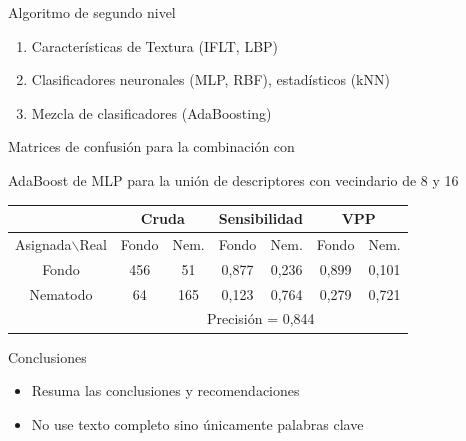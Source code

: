 \documentclass[15pt]{beamer} %
\begin{document}
\begin{frame}{Algoritmo de segundo nivel}
  
  \begin{enumerate}
  \item Características de Textura (IFLT, LBP)
  \item Clasificadores neuronales (MLP, RBF), estadísticos (kNN)
  \item Mezcla de clasificadores (AdaBoosting)
  \end{enumerate}


  \begin{center}
    {\footnotesize Matrices de confusión para la combinación con}

    {\footnotesize AdaBoost de MLP para la unión de descriptores con 
      vecindario de 8 y 16}
    \begin{tabular}{|c|cc|cc|cc|}
      \hline
      & \multicolumn{2}{c|}{Cruda} & \multicolumn{2}{c|}{Sensibilidad} & 
      \multicolumn{2}{c|}{VPP} \\
      \hline
      Asignada$\backslash$Real& Fondo & Nem.& Fondo & Nem.& Fondo & Nem. \\
      \hline
      Fondo & 456 & 51 & 0,877 & 0,236 & 0,899 & 0,101 \\
      Nematodo & 64 & 165 & 0,123 & 0,764 & 0,279 & 0,721 \\
      \hline
      & \multicolumn{6}{c|}{Precisión = 0,844}\\
      \hline
    \end{tabular}
  \end{center}
\end{frame}


\begin{frame}{Conclusiones}
  
  \begin{itemize}
  \item Resuma las conclusiones y recomendaciones
  \item No use texto completo sino únicamente palabras clave
  \end{itemize}
  
\end{frame}
\end{document}
